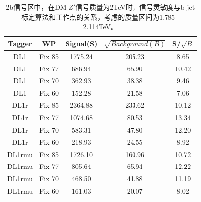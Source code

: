 \begin{table}[ht]
	\begin{center}
		\begin{tabular}{|c|c|c|c|c|}\hline
			Tagger       & WP          & Signal(S)    & $\sqrt{Background(B)}$    & S/$\sqrt{B}$ \\
			\hline
			DL1          & Fix 85      & 1775.24     & 205.23        & 8.65        \\
			DL1          & Fix 77      & 686.94      & 65.90         & 10.42        \\
			DL1          & Fix 70      & 362.93      & 38.38         & 9.46        \\
			DL1          & Fix 60      & 152.28      & 21.58         & 7.06        \\
			\hline
			DL1r          & Fix 85      & 2364.88      & 233.62       & 10.12        \\
			DL1r          & Fix 77      & 1074.68      & 80.53        & 13.34        \\
			DL1r          & Fix 70      & 583.31       & 47.80        & 12.20        \\
			DL1r          & Fix 60      & 218.93       & 24.55        & 8.92        \\
			\hline
			DL1rmu          & Fix 85      & 1726.10     & 160.96       & 10.72        \\
			DL1rmu          & Fix 77      & 805.64      & 65.94        & 12.22        \\
			DL1rmu          & Fix 70      & 468.50      & 41.88        & 11.19        \\
			DL1rmu          & Fix 60      & 161.03      & 20.07        & 8.02        \\
			\hline
		\end{tabular}
	\end{center}
	\caption{
	2b信号区中，在DM $Z\prime$信号质量为2TeV时，信号灵敏度与b-jet标定算法和工作点的关系，考虑的质量区间为1.785 - 2.114TeV。
	}
	\label{tab:SenZ2TeV}
\end{table}

